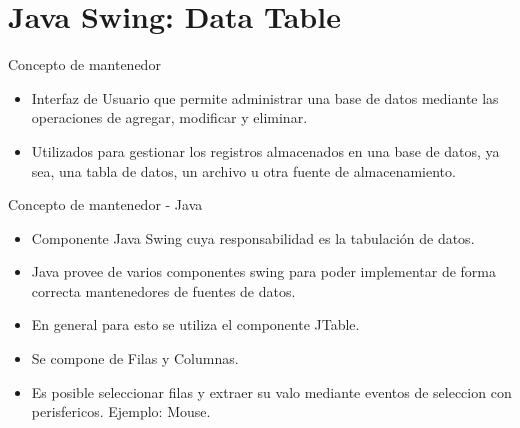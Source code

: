 \section{Java Swing: Data Table}
\begin{frame}{Concepto de mantenedor}
\begin{block}{}
	\begin{itemize}
		\item Interfaz de Usuario que permite administrar una base de datos mediante las operaciones de agregar, modificar y eliminar.
		\item Utilizados para  gestionar los registros almacenados en una base de datos, ya sea, una tabla de datos, un archivo u otra fuente de almacenamiento.
	\end{itemize}
\end{block}
\end{frame}

\begin{frame}{Concepto de mantenedor - Java}

	\begin{itemize}
\item Componente Java Swing cuya responsabilidad es la tabulaci\'on de datos.
\item Java provee de varios componentes swing para poder implementar de forma correcta mantenedores de fuentes de datos.
\item En general para esto se utiliza el componente JTable.
\item Se compone de Filas y Columnas.
\item Es posible seleccionar filas y extraer su valo mediante eventos de seleccion con perisfericos. Ejemplo: Mouse.
\end{itemize}
\end{frame}

